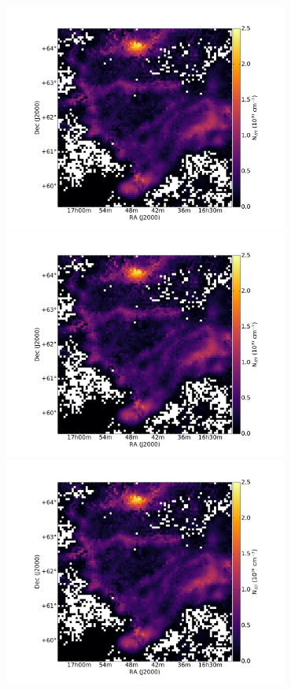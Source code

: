 \documentclass[traditabstract]{aa}
\begin{document}




 \begin{figure}[h]
   \centering
   \includegraphics[page=1,height=7.5cm,trim=110 35 105 75,clip=true]{Figures/Phases_GHIGLS/GHIGLS_NHI.pdf}
   \hspace{5mm}
   \includegraphics[page=4,height=7.5cm,trim=110 35 105 75,clip=true]{Figures/Phases_GHIGLS/GHIGLS_NHI.pdf} \\
   \vspace{5mm}
   \includegraphics[page=2,height=7.5cm,trim=110 35 105 75,clip=true]{Figures/Phases_GHIGLS/GHIGLS_NHI.pdf}

\end{figure}
\end{document}
